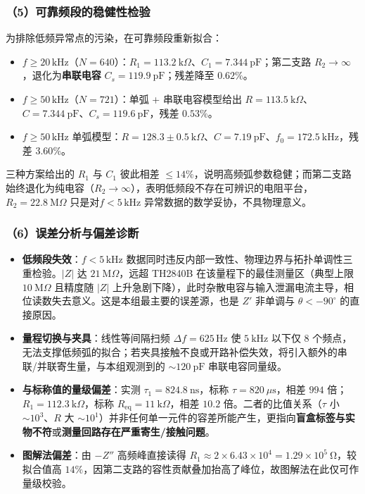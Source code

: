 \documentclass[12pt,a4paper]{ctexart}
\begin{document}
\subsubsection*{（5）可靠频段的稳健性检验}
为排除低频异常点的污染，在可靠频段重新拟合：
\begin{itemize}
    \item $f\ge20\,\mathrm{kHz}$（$N=640$）：$R_1=113.2\ \mathrm{k}\Omega$、$C_1=7.344\ \mathrm{pF}$；第二支路 $R_2\to\infty$，退化为\textbf{串联电容} $C_s=119.9\ \mathrm{pF}$；残差降至 $0.62\%$。
    \item $f\ge50\,\mathrm{kHz}$（$N=721$）：单弧 + 串联电容模型给出 $R=113.5\ \mathrm{k}\Omega$、$C=7.344\ \mathrm{pF}$、$C_s=119.6\ \mathrm{pF}$，残差 $0.53\%$。
    \item $f\ge50\,\mathrm{kHz}$ 单弧模型：$R=128.3\pm0.5\ \mathrm{k}\Omega$、$C=7.19\ \mathrm{pF}$、$f_0=172.5\ \mathrm{kHz}$，残差 $3.60\%$。
\end{itemize}
三种方案给出的 $R_1$ 与 $C_1$ 彼此相差 $\le14\%$，说明高频弧参数稳健；而第二支路始终退化为纯电容（$R_2\to\infty$），表明低频段不存在可辨识的电阻平台，$R_2=22.8\ \mathrm{M}\Omega$ 只是对$f<5\,\mathrm{kHz}$ 异常数据的数学妥协，不具物理意义。

\subsubsection*{（6）误差分析与偏差诊断}
\begin{itemize}
    \item \textbf{低频段失效}：$f<5\,\mathrm{kHz}$ 数据同时违反内部一致性、物理边界与拓扑单调性三重检验。$|Z|$ 达 $21\ \mathrm{M}\Omega$，远超 TH2840B 在该量程下的最佳测量区（典型上限 $10\ \mathrm{M}\Omega$ 且精度随 $|Z|$ 上升急剧下降），此时杂散电容与输入泄漏电流主导，相位读数失去意义。这是本组最主要的误差源，也是 $Z'$ 非单调与 $\theta<-90^\circ$ 的直接原因。
    \item \textbf{量程切换与夹具}：线性等间隔扫频 $\Delta f=625\,\mathrm{Hz}$ 使 $5\ \mathrm{kHz}$ 以下仅 8 个频点，无法支撑低频弧的拟合；若夹具接触不良或开路补偿失效，将引入额外的串联/并联寄生量，与本组观测到的 $\sim120\ \mathrm{pF}$ 串联电容同量级。
    \item \textbf{与标称值的量级偏差}：实测 $\tau_1=824.8\ \mathrm{ns}$，标称 $\tau=820\ \mu\mathrm{s}$，相差 $994$ 倍；$R_1=112.3\ \mathrm{k}\Omega$，标称 $R_{\mathrm{eq}}=11\ \mathrm{k}\Omega$，相差 $10.2$ 倍。二者的比值关系（$\tau$ 小 $\sim10^3$、$R$ 大 $\sim10^1$）并非任何单一元件的容差所能产生，更指向\textbf{盲盒标签与实物不符}或\textbf{测量回路存在严重寄生/接触问题}。
    \item \textbf{图解法偏差}：由 $-Z''$ 高频峰直接读得 $R_1\approx2\times6.43\times10^4=1.29\times10^5\ \mathrm{\Omega}$，较拟合值高 $14\%$，因第二支路的容性贡献叠加抬高了峰位，故图解法在此仅可作量级校验。
\end{itemize}
\end{document}
